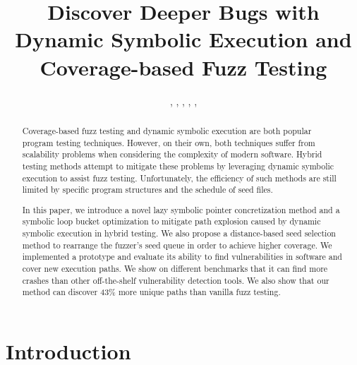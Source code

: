 \documentclass{cta-author}
\begin{document}

\title{Discover Deeper Bugs with Dynamic Symbolic Execution 
	and Coverage-based Fuzz Testing}

\author{, 
	, 
	, 
	, 
	, 
	}
%
\address{
}

\begin{abstract}
Coverage-based fuzz testing and dynamic symbolic execution are both 
popular program testing techniques. However, on their own, both techniques 
suffer from scalability problems when considering the complexity of 
modern software. Hybrid testing methods attempt to mitigate these 
problems by leveraging dynamic symbolic execution to assist fuzz 
testing. Unfortunately, the efficiency of such methods are still 
limited by specific program structures and the schedule of seed files.

In this paper, we introduce a novel lazy symbolic pointer concretization 
method and a symbolic loop bucket optimization to mitigate path explosion 
caused by dynamic symbolic execution in hybrid testing.
We also propose a distance-based seed selection method to rearrange the 
fuzzer's seed queue in order to achieve higher coverage. We implemented 
a prototype and evaluate its ability to find vulnerabilities in software 
and cover new execution paths. We show on different benchmarks that 
it can find more crashes than other off-the-shelf vulnerability 
detection tools. We also show that our method can discover 43\% more 
unique paths than vanilla fuzz testing.
\end{abstract}

\maketitle

\section{Introduction} \label{sec:introduction}

\end{document}
